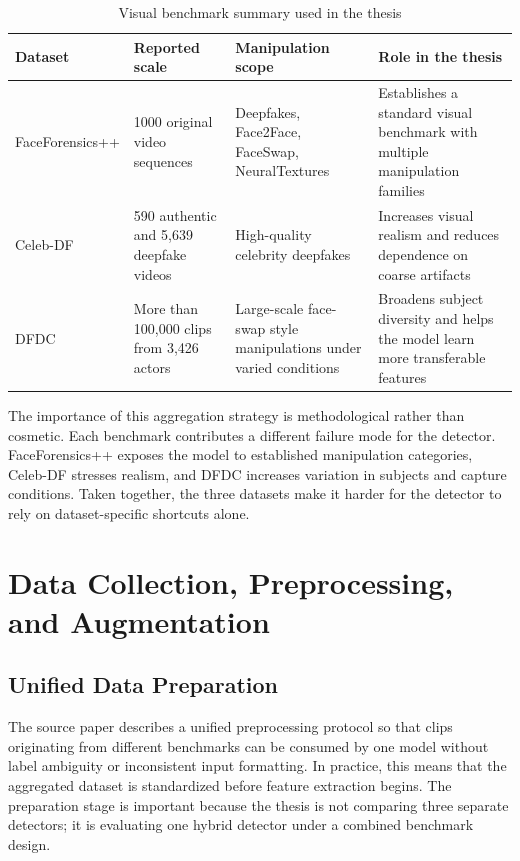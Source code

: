 \begin{table}[H]
\centering
\small
\caption{Visual benchmark summary used in the thesis}
\label{tab:visual-datasets}
\begin{tabular}{p{}p{}p{}p{}}
\toprule
\textbf{Dataset} & \textbf{Reported scale} & \textbf{Manipulation scope} & \textbf{Role in the thesis} \\
\midrule
FaceForensics++ & 1000 original video sequences & Deepfakes, Face2Face, FaceSwap, NeuralTextures & Establishes a standard visual benchmark with multiple manipulation families \\
Celeb-DF & 590 authentic and 5,639 deepfake videos & High-quality celebrity deepfakes & Increases visual realism and reduces dependence on coarse artifacts \\
DFDC & More than 100,000 clips from 3,426 actors & Large-scale face-swap style manipulations under varied conditions & Broadens subject diversity and helps the model learn more transferable features \\
\bottomrule
\end{tabular}
\end{table}

The importance of this aggregation strategy is methodological rather than cosmetic. Each benchmark contributes a different failure mode for the detector. FaceForensics++ exposes the model to established manipulation categories, Celeb-DF stresses realism, and DFDC increases variation in subjects and capture conditions. Taken together, the three datasets make it harder for the detector to rely on dataset-specific shortcuts alone.

\section{Data Collection, Preprocessing, and Augmentation}

\subsection{Unified Data Preparation}

The source paper describes a unified preprocessing protocol so that clips originating from different benchmarks can be consumed by one model without label ambiguity or inconsistent input formatting. In practice, this means that the aggregated dataset is standardized before feature extraction begins. The preparation stage is important because the thesis is not comparing three separate detectors; it is evaluating one hybrid detector under a combined benchmark design.

